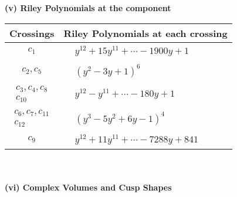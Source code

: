 \documentclass[1p]{elsarticle_modified}
\theoremstyle{definition}
\begin{document}
\newpage\renewcommand{\arraystretch}{1}
\flushleft \textbf{(v) Riley Polynomials at the component}\newline \\
\begin{tabular}{m{50pt}|m{274pt}}
Crossings & \hspace{64pt}Riley Polynomials at each crossing \\
\hline $$\begin{aligned}c_{1}\end{aligned}$$&$\begin{aligned}
&y^{12}+15 y^{11}+\cdots-1900 y+1
\end{aligned}$\\
\hline $$\begin{aligned}c_{2},c_{5}\end{aligned}$$&$\begin{aligned}
&(y^2-3 y+1)^6
\end{aligned}$\\
\hline $$\begin{aligned}c_{3},c_{4},c_{8}\\c_{10}\end{aligned}$$&$\begin{aligned}
&y^{12}- y^{11}+\cdots-180 y+1
\end{aligned}$\\
\hline $$\begin{aligned}c_{6},c_{7},c_{11}\\c_{12}\end{aligned}$$&$\begin{aligned}
&(y^3-5 y^2+6 y-1)^4
\end{aligned}$\\
\hline $$\begin{aligned}c_{9}\end{aligned}$$&$\begin{aligned}
&y^{12}+11 y^{11}+\cdots-7288 y+841
\end{aligned}$\\
\hline
\end{tabular}\\~\\
\newpage\flushleft \textbf{(vi) Complex Volumes and Cusp Shapes}
\end{document}

